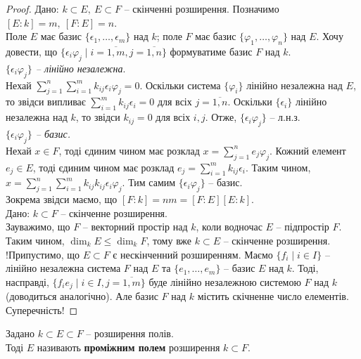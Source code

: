 \documentclass{math_library}
\begin{document}
\begin{proof}
\rightproof Дано: $k \subset E,\ E \subset F$ -- скінченні розширення. Позначимо $[E:k] = m,\ [F:E] = n$. \\
Поле $E$ має базис $\{\epsilon_1,\dots,\epsilon_m\}$ над $k$; поле $F$ має базис $\{\varphi_1,\dots,\varphi_n\}$ над $E$. Хочу довести, що $\{ \epsilon_i \varphi_j \mid i = \overline{1,m}, j = \overline{1,n} \}$ формуватиме базис $F$ над $k$.
\bigskip \\
\textit{$\{\epsilon_i \varphi_j\}$ -- лінійно незалежна}.\\
Нехай $\displaystyle\sum_{j=1}^n \sum_{i=1}^m k_{ij} \epsilon_i \varphi_j = 0$. Оскільки система $\{\varphi_i\}$ лінійно незалежна над $E$, то звідси випливає $\displaystyle\sum_{i=1}^m k_{ij} \epsilon_i = 0$ для всіх $j = \overline{1,n}$. Оскільки $\{\epsilon_i\}$ лінійно незалежна над $k$, то звідси $k_{ij} = 0$ для всіх $i,j$. Отже, $\{\epsilon_i \varphi_j\}$ -- л.н.з.
\bigskip \\
\textit{$\{\epsilon_i \varphi_j\}$ -- базис.}\\
Нехай $x \in F$, тоді єдиним чином має розклад $x = \displaystyle\sum_{j=1}^n e_j \varphi_j$. Кожний елемент $e_j \in E$, тоді єдиним чином має розклад $e_j = \displaystyle\sum_{i=1}^m k_{ij} \epsilon_i$. Таким чином, $x = \displaystyle\sum_{j=1}^n \sum_{i=1}^m k_{ij} k_{ij} \epsilon_i \varphi_j$. Тим самим $\{\epsilon_i \varphi_j\}$ -- базис.\\
Зокрема звідси маємо, що $[F:k] = nm = [F:E][E:k]$.
\bigskip \\
\leftproof Дано: $k \subset F$ -- скінченне розширення.\\
Зауважимо, що $F$ -- векторний простір над $k$, коли водночас $E$ -- підпростір $F$. Таким чином, $\dim_k E \leq \dim_k F$, тому вже $k \subset E$ -- скінченне розширення.\\
!Припустимо, що $E \subset F$ є нескінченний розширенням. Маємо $\{f_i \mid i \in I\}$ -- лінійно незалежна система $F$ над $E$ та $\{e_1,\dots,e_m\}$ -- базис $E$ над $k$. Тоді, насправді, $\{ f_i e_j \mid i \in I, j = \overline{1,m} \}$ буде лінійно незалежною системою $F$ над $k$ (доводиться аналогічно). Але базис $F$ над $k$ містить скічненне число елементів. Суперечність!
\end{proof}

\begin{definition}
Задано $k \subset E \subset F$ -- розширення полів. \\
Тоді $E$ називають \textbf{проміжним полем} розширення $k \subset F$.
\end{definition}
\end{document}
